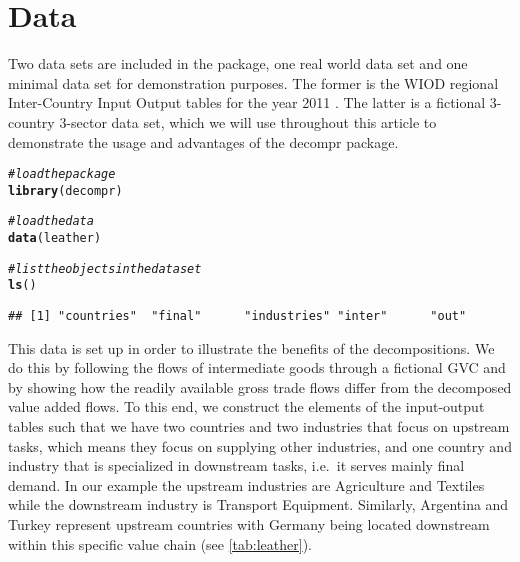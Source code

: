 \documentclass[a4paper]{article}\usepackage[]{graphicx}\usepackage[]{color}
\makeatletter
\newcommand{\hlcom}[1]{\textcolor[rgb]{0.678,0.584,0.686}{\textit{#1}}}%
\newcommand{\hlstd}[1]{\textcolor[rgb]{0.345,0.345,0.345}{#1}}%
\newcommand{\hlkwd}[1]{\textcolor[rgb]{0.737,0.353,0.396}{\textbf{#1}}}%
\newenvironment{kframe}{%
 \def\at@end@of@kframe{}%
 \ifinner\ifhmode%
  \def\at@end@of@kframe{\end{minipage}}%
  \begin{minipage}{\columnwidth}%
 \fi\fi%
 \def\FrameCommand##1{\hskip\@totalleftmargin \hskip-\fboxsep
 \colorbox{shadecolor}{##1}\hskip-\fboxsep
     \hskip-\linewidth \hskip-\@totalleftmargin \hskip\columnwidth}%
 \MakeFramed {\advance\hsize-\width
   \@totalleftmargin\z@ \linewidth\hsize
   \@setminipage}}%
 {\par\unskip\endMakeFramed%
 \at@end@of@kframe}
\newenvironment{knitrout}{}{} %
\makeatother
\begin{document}
\section{Data}
\label{sec:data}
Two data sets are included in the package, one real world data set and one minimal data set for demonstration purposes.
The former is the WIOD regional Inter-Country Input Output tables for the year 2011 \parencite{timmer2012world}. 
The latter is a fictional 3-country 3-sector data set, which we will use throughout this article to demonstrate the usage and advantages of the decompr package.

\begin{knitrout}
\color{fgcolor}\begin{kframe}
\begin{alltt}
\hlcom{# load the package}
\hlkwd{library}\hlstd{(decompr)}
\end{alltt}
\end{kframe}
\end{knitrout}

\begin{knitrout}
\color{fgcolor}\begin{kframe}
\begin{alltt}
\hlcom{# load the data}
\hlkwd{data}\hlstd{(leather)}

\hlcom{# list the objects in the data set}
\hlkwd{ls}\hlstd{()}
\end{alltt}
\begin{verbatim}
## [1] "countries"  "final"      "industries" "inter"      "out"
\end{verbatim}
\end{kframe}
\end{knitrout}

This data is set up in order to illustrate the benefits of the decompositions.
We do this by following the flows of intermediate goods through a fictional GVC and by showing how the readily available gross trade flows differ from the decomposed value added flows.
To this end, we construct the elements of the input-output tables such that we have two countries and two industries that focus on upstream tasks, 
which means they focus on supplying other industries,
and one country and industry that is specialized in downstream tasks, i.e.~it serves mainly final demand.
In our example the upstream industries are Agriculture and Textiles while the downstream industry is Transport Equipment.
Similarly, Argentina and Turkey represent upstream countries with Germany being located downstream within this specific value chain (see \cref{tab:leather}).
\end{document}
